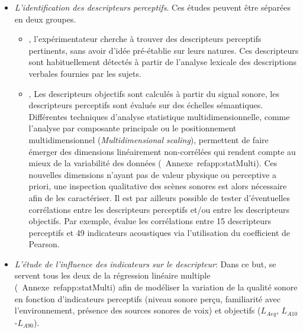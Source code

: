 \begin{itemize}

\item \emph{L'identification des descripteurs perceptifs}. 
Ces études peuvent être séparées en deux groupes. 

\begin{itemize}
\item {}, l'expérimentateur cherche à trouver  des descripteurs perceptifs pertinents, sans avoir d'idée pré-établie sur leurs natures. Ces descripteurs sont habituellement détectés à partir de l'analyse lexicale des descriptions verbales fournies par les sujets.
\item {},   Les descripteurs objectifs sont calculés à partir du signal sonore, les descripteurs perceptifs sont évalués sur des échelles sémantiques. Différentes techniques d'analyse statistique multidimensionnelle, comme l'analyse par composante principale ou le positionnement multidimensionnel (\emph{Multidimensional scaling}), permettent de faire émerger des dimensions linéairement non-corrélées qui rendent compte au mieux de la variabilité des données \citep{cain2013development,torija2013application} (\Cf~Annexe~ref{app:statMulti}). Ces nouvelles dimensions n'ayant pas de valeur physique ou perceptive a priori, une inspection qualitative des scènes sonores est alors nécessaire afin de les caractériser. Il est par ailleurs possible de tester d'éventuelles corrélations entre les descripteurs perceptifs et/ou entre les descripteurs objectifs. Par exemple, \citep{torija2013application} évalue les corrélations entre 15 descripteurs perceptifs et 49 indicateurs acoustiques via l'utilisation du coefficient de Pearson.
\end{itemize}

\item \emph{L'étude de l'influence des indicateurs sur le descripteur}: 
  Dans ce but, \citep{lavandier2006contribution,ricciardi2015sound} se servent tous les deux de la régression linéaire multiple (\Cf~Annexe~ref{app:statMulti}) afin de modéliser la variation de la qualité sonore en fonction d'indicateurs perceptifs (niveau sonore perçu, familiarité avec l'environnement, présence des sources sonores de voix) et objectifs ($L_{Aeq}$, $L_{A10}$-$L_{A90}$).


\end{itemize}
